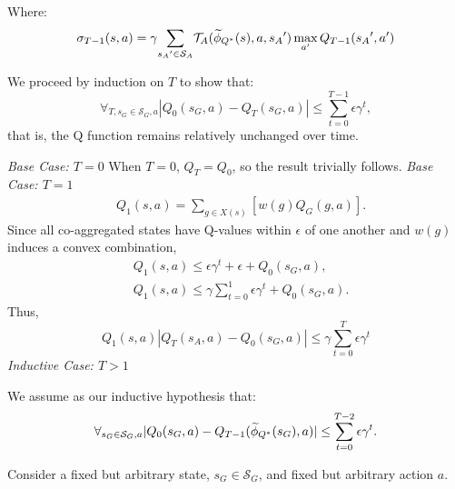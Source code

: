 Where:
\begin{equation}
\sigma_{T-1}(s,a) = \gamma \underset{{s_A}' \in \mathcal{S}_A}{\sum} \mathcal{T}_A(\widetilde \phi_{Q^*}(s),a,{s_A}') \max_{a'} Q_{T-1}({s_A}', a')
\end{equation}

We proceed by induction on $T$ to show that:
\begin{equation}
\forall_{T, s_G \in \mathcal{S}_G, a} |Q_0(s_G, a) - Q_T(s_G, a)| \leq \sum_{t=0}^{T-1} \epsilon \gamma^{t},
\end{equation}
that is, the Q function remains relatively unchanged over time.

\textit{Base Case: $T = 0$}
When $T = 0$, $Q_T = Q_0$, so the result trivially follows.
\textit{Base Case: $T = 1$}
\begin{align*}
&Q_1(s,a) = \underset{g \in X(s)}{\sum} \left[ w(g)Q_G(g,a) \right].
\end{align*}
Since all co-aggregated states have Q-values within $\epsilon$ of one another and $w(g)$ induces a convex combination,
\begin{align*}
&Q_1(s,a) \leq \epsilon \gamma^t + \epsilon + Q_0(s_G, a),\\
&Q_1(s,a) \leq \gamma\sum_{t=0}^{1} \epsilon \gamma^t + Q_0(s_G, a).
\end{align*}
Thus,
\begin{equation}
Q_1(s,a) \left| Q_{T}(s_A, a) - Q_0(s_G,a) \right| \leq \gamma\sum_{t=0}^{T}\epsilon \gamma^t
\end{equation}
\textit{Inductive Case: $T > 1$}

We assume as our inductive hypothesis that:
\begin{equation}
\forall_{s_G \in \mathcal{S}_G, a} |Q_0(s_G, a) - Q_{T-1}(\widetilde \phi_{Q^*}(s_G), a)| \leq \sum_{t=0}^{T-2} \epsilon \gamma^t.\\
\end{equation}

Consider a fixed but arbitrary state, $s_G \in \mathcal{S}_G$, and fixed but arbitrary action $a$.

